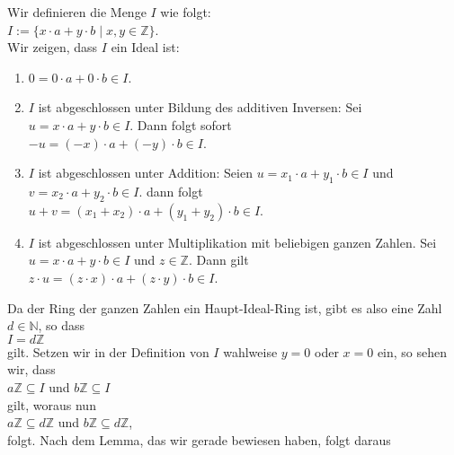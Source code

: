 \proof
Wir definieren die Menge $I$ wie folgt:
\\[0.2cm]
\hspace*{1.3cm}
$I := \bigl\{ x \cdot a + y \cdot b \mid x,y \in \mathbb{Z} \bigr\}$.
\\[0.2cm]
Wir zeigen, dass $I$ ein Ideal ist:
\begin{enumerate}
\item $0 = 0 \cdot a + 0 \cdot b \in I$.
\item $I$ ist abgeschlossen unter Bildung des additiven Inversen:  Sei
      $u = x \cdot a + y \cdot b \in I$.  Dann folgt sofort
      \\[0.2cm]
      \hspace*{1.3cm}
      $-u = (-x) \cdot a + (-y) \cdot b \in I$.
\item $I$ ist abgeschlossen unter Addition: Seien  
      $u = x_1 \cdot a + y_1 \cdot b \in I$ und $v = x_2 \cdot a + y_2 \cdot b \in I$.
      dann folgt
      \\[0.2cm]
      \hspace*{1.3cm}
      $u + v = (x_1 + x_2) \cdot a + (y_1 + y_2) \cdot b \in I$.
\item $I$ ist abgeschlossen unter Multiplikation mit beliebigen ganzen Zahlen.  
      Sei $u = x \cdot a + y \cdot b \in I$ und $z \in \mathbb{Z}$.  Dann gilt
      \\[0.2cm]
      \hspace*{1.3cm}
      $z \cdot u = (z \cdot x) \cdot a + (z \cdot y) \cdot b \in I$.
\end{enumerate}
Da der Ring der ganzen Zahlen ein Haupt-Ideal-Ring ist, gibt es also eine Zahl $d \in \mathbb{N}$, 
so dass
\\[0.2cm]
\hspace*{1.3cm}
$I = d\mathbb{Z}$
\\[0.2cm]
gilt.  Setzen wir in der Definition von $I$ wahlweise $y = 0$ oder $x = 0$ ein, so sehen wir, dass
\\[0.2cm]
\hspace*{1.3cm}
$a\mathbb{Z} \subseteq I$ \quad und \quad $b\mathbb{Z} \subseteq I$
\\[0.2cm]
gilt, woraus nun
\\[0.2cm]
\hspace*{1.3cm}
$a\mathbb{Z} \subseteq d\mathbb{Z}$ \quad und \quad $b\mathbb{Z} \subseteq d\mathbb{Z}$,
\\[0.2cm]
folgt.  Nach dem Lemma, das wir gerade bewiesen haben, folgt daraus
\\[0.2cm]
\hspace*{1.3cm}
